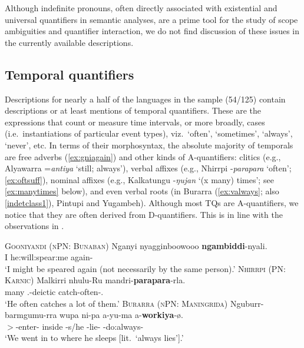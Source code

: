 \documentclass[12pt,egregdoesnotlikesansseriftitles]{scrartcl}
\makeatletter
\newcommand{\ofy}{/125} %
\makeatother
\begin{document}
Although indefinite pronouns, often directly associated with existential and universal quantifiers in semantic analyses, are a prime tool for the study of scope ambiguities and quantifier interaction, we do not find discussion of these issues in the currently available descriptions. %

\subsection{Temporal quantifiers}
\label{sec:tempq}
Descriptions for nearly a half of the languages in the sample (54\ofy) contain descriptions or at least mentions of temporal quantifiers. These are the expressions that count or measure time intervals, or more broadly, cases (i.e.\ instantiations of particular event types), viz.\ `often', `sometimes', `always', `never', etc. In terms of their morphosyntax, the absolute majority of temporals are free adverbs (\ref{ex:gniagain}) and other kinds of A-quantifiers: clitics (e.g., Alyawarra =\textit{antiya} `still; always'), verbal affixes (e.g., Nhirrpi -\textit{parapara} `often'; \ref{ex:oftsuff}), %
nominal affixes (e.g., Kalkatungu -\textit{ŋujan} `(x many) times'; see \ref{ex:manytimes} below), and even verbal roots (in Burarra (\ref{ex:valways}; also \ref{indetclass1}), Pintupi and Yugambeh). Although most TQs are A-quantifiers, we notice that they are often derived from D-quantifiers. This is in line with the observations in \citealt{gil93,keenanpaperno17ov}.
\begin{exe}
  \ex\label{ex:gniagain} \textsc{Gooniyandi (nPN: Bunaban)}\hfill {}
  \gll Nganyi nyagginboowooo \textbf{ngambiddi}-nyali.\\
  I he:will:spear:me again-\Rep\\
  \glt `I might be speared again (not necessarily by the same person).'
  \ex\label{ex:oftsuff} \textsc{Nhirrpi (PN: Karnic)}\hfill {}
  \gll Malkirri nhulu-Ru mandri-\textbf{parapara}-rla.\\
  many \Tsg.\Erg-deictic catch-often-\Prs.\Prog\\
  `He often catches a lot of them.'
  \ex\label{ex:valways} \textsc{Burarra (nPN: Maningrida)}\hfill {}
  \gll Nguburr-barmgumu-rra wupa ni-pa a-yu-ma a-\textbf{workiya}-ø.\\
  \First$>$\Second\Aug-enter-\Pc{} inside \Third\Min-s/he  \Third\Min-lie-\Ctp{} \Third\Min-do:always-\Ctp\\
  \glt `We went in to where he sleeps [lit.\ `always lies'].'
\end{exe}
\end{document}
